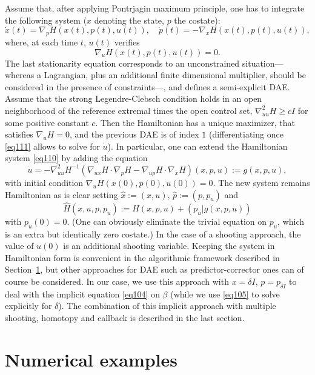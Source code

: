 \documentclass[AMA,STIX1COL]{WileyNJD-v2}
\begin{document}
Assume that, after applying Pontrjagin maximum principle, one has to integrate the following system
($x$ denoting the state, $p$ the costate):
\begin{equation} \label{eq110}
  \dot{x}(t) = \nabla_p H(x(t),p(t),u(t)),\quad \dot{p}(t) = -\nabla_x H(x(t),p(t),u(t)), 
\end{equation}
where, at each time $t$, $u(t)$ verifies
\begin{equation} \label{eq111}
  \nabla_u H(x(t),p(t),u(t)) = 0.
\end{equation}
The last stationarity equation corresponds to an unconstrained situation---whereas a Lagrangian, plus an
additional finite dimensional multiplier, should be considered in the presence of constraints---, and defines
a semi-explicit DAE.
Assume that the strong Legendre-Clebsch condition holds in an open neighborhood of the reference extremal times 
the open control set, $\nabla^2_{uu} H \geq c I$ for some positive constant $c$. Then the Hamiltonian has a unique 
maximizer, that satisfies $\nabla_u H=0$, and the previous DAE is of index $1$ (differentiating once
\eqref{eq111} allows to solve for $\dot{u}$). In particular, one
can extend the Hamiltonian system \eqref{eq110} by adding the equation
$$ \dot{u} = -\nabla^2_{uu} H^{-1} (\nabla_{ux} H \cdot\nabla_p H - \nabla_{up} H\cdot\nabla_{x} H)(x,p,u)
   := g(x,p,u), $$
with initial condition $\nabla_u H(x(0),p(0),u(0))=0$.
The new system remains Hamiltonian as is clear setting
$\hat{x}:=(x,u)$, $\hat{p}:=(p,p_u)$ and
$$ \hat{H}(x,u,p,p_u) := H(x,p,u) + (p_u|g(x,p,u)) $$
with $p_u(0)=0$. (One can obviously eliminate the trivial equation on $p_u$, which is an extra but
identically zero costate.) In the case of a shooting approach, the value of $u(0)$ is an additional shooting
variable. Keeping the system in Hamiltonian form is convenient in the algorithmic framework described in
Section~\ref{sec4}, but other approaches for DAE such as predictor-corrector ones can of course be considered.
In our case, we use this approach with $x=\delta I$, $p=p_{\delta I}$ to deal with the implicit equation
\eqref{eq104} on $\beta$ (while we use \eqref{eq105} to solve explicitly for $\delta$).
The combination of this implicit 
approach with multiple shooting, homotopy and callback is described in the last section.

\section{Numerical examples} \label{sec4}
\end{document}
